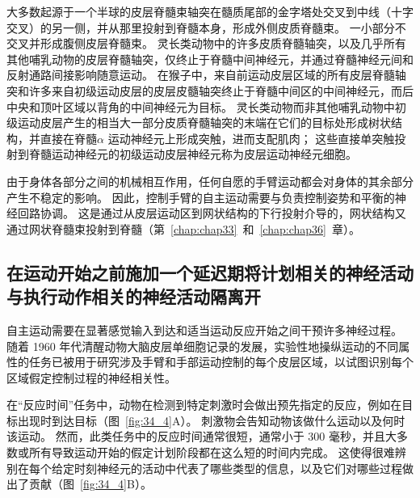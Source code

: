 大多数起源于一个半球的皮层脊髓束轴突在髓质尾部的金字塔处交叉到中线（十字交叉）的另一侧，并从那里投射到脊髓本身，形成外侧皮质脊髓束。
一小部分不交叉并形成腹侧皮层脊髓束。
灵长类动物中的许多皮质脊髓轴突，以及几乎所有其他哺乳动物的皮层脊髓轴突，仅终止于脊髓中间神经元，并通过脊髓神经元间和反射通路间接影响随意运动。
在猴子中，来自前运动皮层区域的所有皮层脊髓轴突和许多来自初级运动皮层的皮层皮髓轴突终止于脊髓中间区的中间神经元，而后中央和顶叶区域以背角的中间神经元为目标。
灵长类动物而非其他哺乳动物中初级运动皮层产生的相当大一部分皮质脊髓轴突的末端在它们的目标处形成树状结构，并直接在脊髓$ \alpha $ 运动神经元上形成突触，进而支配肌肉；
这些直接单突触投射到脊髓运动神经元的初级运动皮层神经元称为皮层运动神经元细胞。


由于身体各部分之间的机械相互作用，任何自愿的手臂运动都会对身体的其余部分产生不稳定的影响。
因此，控制手臂的自主运动需要与负责控制姿势和平衡的神经回路协调。
这是通过从皮层运动区到网状结构的下行投射介导的，网状结构又通过网状脊髓束投射到脊髓（第~\ref{chap:chap33}~和~\ref{chap:chap36}~章）。



\subsection{在运动开始之前施加一个延迟期将计划相关的神经活动与执行动作相关的神经活动隔离开}

自主运动需要在显著感觉输入到达和适当运动反应开始之间干预许多神经过程。
随着 1960 年代清醒动物大脑皮层单细胞记录的发展，实验性地操纵运动的不同属性的任务已被用于研究涉及手臂和手部运动控制的每个皮层区域，以试图识别每个区域假定控制过程的神经相关性。


在“反应时间”任务中，动物在检测到特定刺激时会做出预先指定的反应，例如在目标出现时到达目标（图~\ref{fig:34_4}A）。 
刺激物会告知动物该做什么运动以及何时该运动。
然而，此类任务中的反应时间通常很短，通常小于 300 毫秒，并且大多数或所有导致运动开始的假定计划阶段都在这么短的时间内完成。
这使得很难辨别在每个给定时刻神经元的活动中代表了哪些类型的信息，以及它们对哪些过程做出了贡献（图~\ref{fig:34_4}B）。


